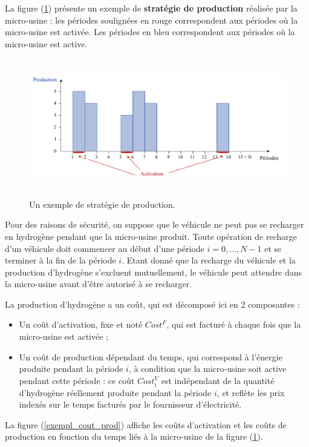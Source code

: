 La figure (\ref{exempl_strategie_prod}) présente un exemple de \textbf{stratégie de production} réalisée par la micro-usine : les périodes soulignées en rouge correspondent aux périodes où la micro-usine est activée. Les périodes en bleu correspondent aux périodes où la micro-usine est active.


\begin{figure}[H]
	\centerline{
		\includegraphics[height=6cm]{images_these/exempl_cout_prod.pdf}}
	\caption[Une stratégie de production]{Un exemple de stratégie de production. }
	\label{exempl_strategie_prod}
\end{figure}


Pour des raisons de sécurité, on suppose que le véhicule ne peut pas se recharger en hydrogène pendant que la micro-usine produit. Toute opération de recharge d'un véhicule doit commencer au début d'une période $i = 0, \dots, N - 1$ et se terminer à la fin de la période $i$. Etant donné que la recharge du véhicule et la production d'hydrogène s'excluent mutuellement, le véhicule peut attendre dans la micro-usine avant d'être autorisé à se recharger. 

La production d'hydrogène a un coût, qui est décomposé ici en 2 composantes : 
\begin{itemize}[label=$\square$]
	\item Un coût d'activation, fixe et noté $Cost^F$, qui est facturé à chaque fois que la micro-usine est activée ;
	\item Un coût de production dépendant du temps, qui correspond à l'énergie produite pendant la période $i$, à condition que la micro-usine soit active pendant cette période : ce coût $Cost^V_i$ est indépendant de la quantité d'hydrogène réellement produite pendant la période $i$, et reflète les prix indexés sur le temps facturés par le fournisseur d'électricité.
\end{itemize}

La figure (\ref{exempl_cout_prod}) affiche les coûts d'activation et les coûts de production en fonction du temps liés à la micro-usine de la figure (\ref{exempl_strategie_prod}).

